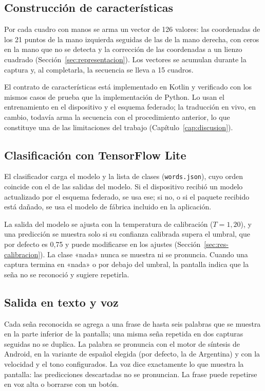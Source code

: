 \subsection{Construcción de características}

Por cada cuadro con manos se arma un vector de 126 valores: las coordenadas de los 21 puntos de la mano izquierda seguidas de las de la mano derecha, con ceros en la mano que no se detecta y la corrección de las coordenadas a un lienzo cuadrado (Sección~\ref{sec:representacion}). Los vectores se acumulan durante la captura y, al completarla, la secuencia se lleva a 15 cuadros.

El contrato de características está implementado en Kotlin y verificado con los mismos casos de prueba que la implementación de Python. Lo usan el entrenamiento en el dispositivo y el esquema federado; la traducción en vivo, en cambio, todavía arma la secuencia con el procedimiento anterior, lo que constituye una de las limitaciones del trabajo (Capítulo~\ref{cap:discusion}).

\subsection{Clasificación con TensorFlow Lite}

El clasificador carga el modelo y la lista de clases (\texttt{words.json}), cuyo orden coincide con el de las salidas del modelo. Si el dispositivo recibió un modelo actualizado por el esquema federado, se usa ese; si no, o si el paquete recibido está dañado, se usa el modelo de fábrica incluido en la aplicación.

La salida del modelo se ajusta con la temperatura de calibración ($T = 1{,}20$), y una predicción se muestra solo si su confianza calibrada supera el umbral, que por defecto es 0,75 y puede modificarse en los ajustes (Sección~\ref{sec:res-calibracion}). La clase «nada» nunca se muestra ni se pronuncia. Cuando una captura termina en «nada» o por debajo del umbral, la pantalla indica que la seña no se reconoció y sugiere repetirla.

\subsection{Salida en texto y voz}

Cada seña reconocida se agrega a una frase de hasta seis palabras que se muestra en la parte inferior de la pantalla; una misma seña repetida en dos capturas seguidas no se duplica. La palabra se pronuncia con el motor de síntesis de Android, en la variante de español elegida (por defecto, la de Argentina) y con la velocidad y el tono configurados. La voz dice exactamente lo que muestra la pantalla: las predicciones descartadas no se pronuncian. La frase puede repetirse en voz alta o borrarse con un botón.

